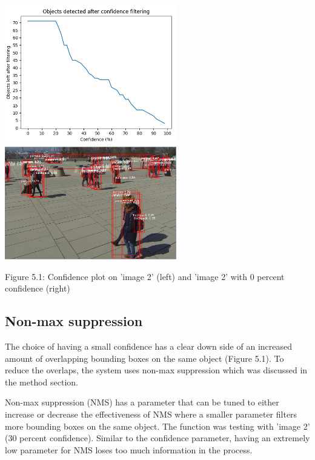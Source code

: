 \documentclass[12pt]{report}
\begin{document}
\begin{center}
\includegraphics[width=75mm]{./images/appendix/ConfidencePlot.PNG}
\includegraphics[width=75mm]{./images/zeroConfidence.PNG}

\vspace{3mm}
{\footnotesize Figure 5.1: Confidence plot on 'image 2' (left) and 'image 2' with 0 percent confidence (right)}
\end{center}

\subsection*{Non-max suppression}

The choice of having a small confidence has a clear down side of an increased amount of overlapping bounding boxes on the same object (Figure 5.1). To reduce the overlaps, the system uses non-max suppression which was discussed in the method section.  

\vspace{2mm}

Non-max suppression (NMS) has a parameter that can be tuned to either increase or decrease the effectiveness of NMS where a smaller parameter filters more bounding boxes on the same object. The function was testing with 'image 2' (30 percent confidence). Similar to the confidence parameter, having an extremely low parameter for NMS loses too much information in the process. 
\end{document}
